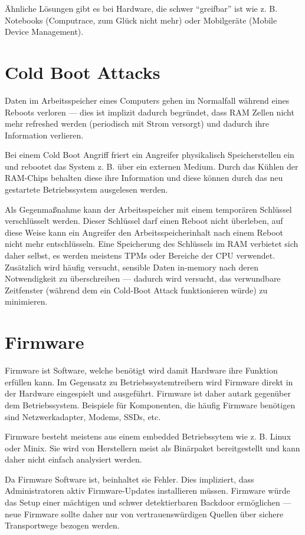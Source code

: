 Ähnliche Lösungen gibt es bei Hardware, die schwer ``greifbar'' ist wie z. B. Notebooks (Computrace, zum Glück nicht mehr) oder Mobilgeräte (Mobile Device Management).

\section{Cold Boot Attacks}

Daten im Arbeitsspeicher eines Computers gehen im Normalfall während eines Reboots verloren --- dies ist implizit dadurch begründet, dass RAM Zellen nicht mehr refreshed werden (periodisch mit Strom versorgt) und dadurch ihre Information verlieren.

Bei einem Cold Boot Angriff friert ein Angreifer physikalisch Speicherstellen ein und rebootet das System z. B. über ein externen Medium. Durch das Kühlen der RAM-Chips behalten diese ihre Information und diese können durch das neu gestartete Betriebssystem ausgelesen werden.

Als Gegenmaßnahme kann der Arbeitsspeicher mit einem temporären Schlüssel verschlüsselt werden. Dieser Schlüssel darf einen Reboot nicht überleben, auf diese Weise kann ein Angreifer den Arbeitsspeicherinhalt nach einem Reboot nicht mehr entschlüsseln. Eine Speicherung des Schlüssels im RAM verbietet sich daher selbst, es werden meistens TPMs oder Bereiche der CPU verwendet. Zusätzlich wird häufig versucht, sensible Daten in-memory nach deren Notwendigkeit zu überschreiben --- dadurch wird versucht, das verwundbare Zeitfenster (während dem ein Cold-Boot Attack funktionieren würde) zu minimieren.

\section{Firmware}

Firmware ist Software, welche benötigt wird damit Hardware ihre Funktion erfüllen kann. Im Gegensatz zu Betriebssystemtreibern wird Firmware direkt in der Hardware eingespielt und ausgeführt. Firmware ist daher autark gegenüber dem Betriebssystem. Beispiele für Komponenten, die häufig Firmware benötigen sind Netzwerkadapter, Modems, SSDs, etc.

Firmware besteht meistens aus einem embedded Betriebssytem wie z. B. Linux oder Minix. Sie wird von Herstellern meist als Binärpaket bereitgestellt und kann daher nicht einfach analysiert werden.

Da Firmware Software ist, beinhaltet sie Fehler. Dies impliziert, dass Administratoren aktiv Firmware-Updates installieren müssen. Firmware würde das Setup einer mächtigen und schwer detektierbaren Backdoor ermöglichen --- neue Firmware sollte daher nur von vertrauenswürdigen Quellen über sichere Transportwege bezogen werden.

